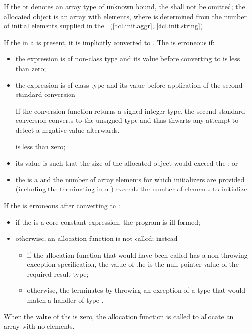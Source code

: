 \pnum
If the  or 
denotes an array type of unknown bound,
the  shall not be omitted;
the allocated object is an array with  elements,
where  is determined from the number of initial elements
supplied in
the ~(\ref{dcl.init.aggr}, \ref{dcl.init.string}).

\pnum
{}%
If the  in a 
is present, it is implicitly converted to .
%
The  is erroneous if:
\begin{itemize}
\item
the expression is of non-class type and its value before converting to
 is less than zero;

\item
the expression is of class type and its value before application of the second
standard conversion
\begin{footnote}
If the conversion function
returns a signed integer type, the second standard conversion converts to the
unsigned type  and thus thwarts any attempt to detect a
negative value afterwards.
\end{footnote}
is less than zero;

\item
its value is such that the size of the allocated object would exceed the
 ; or

\item
the  is a  and the
number of array elements for which initializers are provided (including the
terminating  in a ) exceeds the
number of elements to initialize.
\end{itemize}

If the  is erroneous after converting to :
\begin{itemize}
\item
if the  is a core constant expression,
the program is ill-formed;
\item
otherwise, an allocation function is not called; instead
\begin{itemize}
\item
if the allocation function that would have been called
has a non-throwing exception specification,
the value of the 
is the null pointer value of the required result type;
\item
otherwise, the  terminates by throwing an
exception of a type that would match a handler of type
.
\end{itemize}
\end{itemize}
When the value of the  is zero, the allocation
function is called to allocate an array with no elements.

